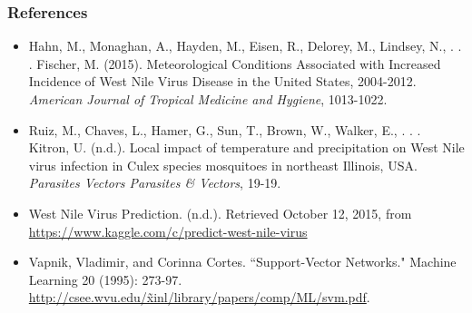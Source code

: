 \documentclass{article} %
\begin{document}
\subsubsection*{References}
\begin{itemize}

\item[] Hahn, M., Monaghan, A., Hayden, M., Eisen, R., Delorey, M., Lindsey, N., . . . Fischer, M. (2015). Meteorological Conditions Associated with Increased Incidence of West Nile Virus Disease in the United States, 2004-2012. \textit{American Journal of Tropical Medicine and Hygiene}, 1013-1022.

\item[] Ruiz, M., Chaves, L., Hamer, G., Sun, T., Brown, W., Walker, E., . . . Kitron, U. (n.d.). Local impact of temperature and precipitation on West Nile virus infection in Culex species mosquitoes in northeast Illinois, USA. \textit{Parasites Vectors Parasites \& Vectors}, 19-19.

\item[] West Nile Virus Prediction. (n.d.). Retrieved October 12, 2015, from \href{https://www.kaggle.com/c/predict-west-nile-virus}{https://www.kaggle.com/c/predict-west-nile-virus}

\item[] Vapnik, Vladimir, and Corinna Cortes. ``Support-Vector Networks." Machine Learning 20 (1995): 273-97.  \href{http://csee.wvu.edu/~xinl/library/papers/comp/ML/svm.pdf}{http://csee.wvu.edu/\~xinl/library/papers/comp/ML/svm.pdf}.

\end{itemize}
\end{document}
